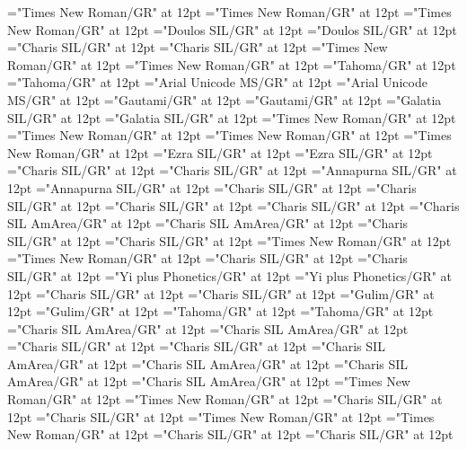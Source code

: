 \documentclass[a4paper]{article}
\begin{document}
\font\spanes="Times New Roman/GR" at 12pt
\font\divfa="Times New Roman/GR" at 12pt
\font\spanfa="Times New Roman/GR" at 12pt
\font\divfrfonipa="Doulos SIL/GR" at 12pt
\font\spanfrfonipa="Doulos SIL/GR" at 12pt
\font\divfrZxxxxaudio="Charis SIL/GR" at 12pt
\font\spanfrZxxxxaudio="Charis SIL/GR" at 12pt
\font\divfr="Times New Roman/GR" at 12pt
\font\spanfr="Times New Roman/GR" at 12pt
\font\divggofonipaxemic="Tahoma/GR" at 12pt
\font\spanggofonipaxemic="Tahoma/GR" at 12pt
\font\divggoINxaheri="Arial Unicode MS/GR" at 12pt
\font\spanggoINxaheri="Arial Unicode MS/GR" at 12pt
\font\divggoTeluIN="Gautami/GR" at 12pt
\font\spanggoTeluIN="Gautami/GR" at 12pt
\font\divgrc="Galatia SIL/GR" at 12pt
\font\spangrc="Galatia SIL/GR" at 12pt
\font\divhagLatnGHfonipaxemic="Times New Roman/GR" at 12pt
\font\spanhagLatnGHfonipaxemic="Times New Roman/GR" at 12pt
\font\divhag="Times New Roman/GR" at 12pt
\font\spanhag="Times New Roman/GR" at 12pt
\font\divhbo="Ezra SIL/GR" at 12pt
\font\spanhbo="Ezra SIL/GR" at 12pt
\font\divhe="Charis SIL/GR" at 12pt
\font\spanhe="Charis SIL/GR" at 12pt
\font\divhi="Annapurna SIL/GR" at 12pt
\font\spanhi="Annapurna SIL/GR" at 12pt
\font\divhu="Charis SIL/GR" at 12pt
\font\spanhu="Charis SIL/GR" at 12pt
\font\divibafonipa="Charis SIL/GR" at 12pt
\font\spanibafonipa="Charis SIL/GR" at 12pt
\font\diviba="Charis SIL AmArea/GR" at 12pt
\font\spaniba="Charis SIL AmArea/GR" at 12pt
\font\dividZxxxxaudio="Charis SIL/GR" at 12pt
\font\spanidZxxxxaudio="Charis SIL/GR" at 12pt
\font\divid="Times New Roman/GR" at 12pt
\font\spanid="Times New Roman/GR" at 12pt
\font\diviixpin="Charis SIL/GR" at 12pt
\font\spaniixpin="Charis SIL/GR" at 12pt
\font\divii="Yi plus Phonetics/GR" at 12pt
\font\spanii="Yi plus Phonetics/GR" at 12pt
\font\divkm="Charis SIL/GR" at 12pt
\font\spankm="Charis SIL/GR" at 12pt
\font\divko="Gulim/GR" at 12pt
\font\spanko="Gulim/GR" at 12pt
\font\divlv="Tahoma/GR" at 12pt
\font\spanlv="Tahoma/GR" at 12pt
\font\divmiz="Charis SIL AmArea/GR" at 12pt
\font\spanmiz="Charis SIL AmArea/GR" at 12pt
\font\divms="Charis SIL/GR" at 12pt
\font\spanms="Charis SIL/GR" at 12pt
\font\divmxbfonipa="Charis SIL AmArea/GR" at 12pt
\font\spanmxbfonipa="Charis SIL AmArea/GR" at 12pt
\font\divmxb="Charis SIL AmArea/GR" at 12pt
\font\spanmxb="Charis SIL AmArea/GR" at 12pt
\font\divmy="Times New Roman/GR" at 12pt
\font\spanmy="Times New Roman/GR" at 12pt
\font\divne="Charis SIL/GR" at 12pt
\font\spanne="Charis SIL/GR" at 12pt
\font\divpt="Times New Roman/GR" at 12pt
\font\spanpt="Times New Roman/GR" at 12pt
\font\divqaafonipaxkal="Charis SIL/GR" at 12pt
\font\spanqaafonipaxkal="Charis SIL/GR" at 12pt
\end{document}
